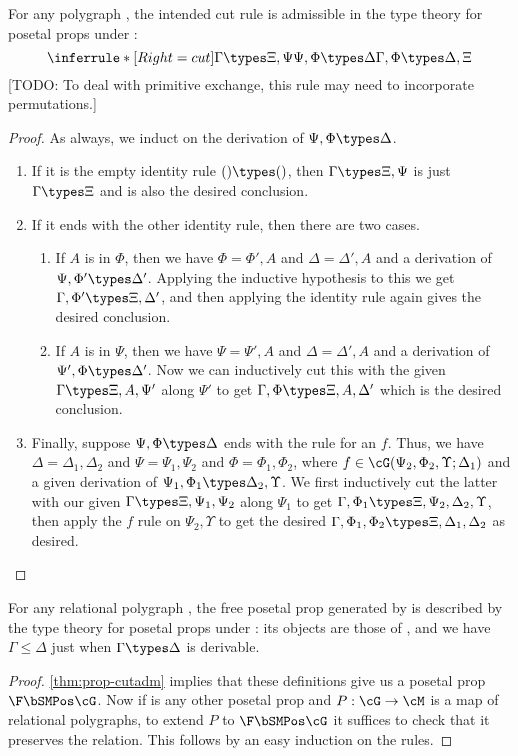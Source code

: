 \begin{thm}\label{thm:prop-cutadm}
  For any polygraph \cG, the intended cut rule is admissible in the type theory for posetal props under \cG:
  \[ \inferrule*[Right=cut]{\Gamma\types\Xi,\Psi \\ \Psi,\Phi \types \Delta}{\Gamma,\Phi \types \Delta,\Xi}\]
  [TODO: To deal with primitive exchange, this rule may need to incorporate permutations.]
\end{thm}
\begin{proof}
  As always, we induct on the derivation of $\Psi,\Phi \types \Delta$.
  \begin{enumerate}
  \item If it is the empty identity rule $()\types()$, then $\Gamma\types\Xi,\Psi$ is just $\Gamma\types\Xi$ and is also the desired conclusion.
  \item If it ends with the other identity rule, then there are two cases.
    \begin{enumerate}
    \item If $A$ is in $\Phi$, then we have $\Phi=\Phi',A$ and $\Delta=\Delta',A$ and a derivation of $\Psi,\Phi'\types\Delta'$.
      Applying the inductive hypothesis to this we get $\Gamma,\Phi'\types \Xi,\Delta'$, and then applying the identity rule again gives the desired conclusion.
    \item If $A$ is in $\Psi$, then we have $\Psi=\Psi',A$ and $\Delta=\Delta',A$ and a derivation of $\Psi',\Phi\types\Delta'$.
      Now we can inductively cut this with the given $\Gamma\types \Xi,A,\Psi'$ along $\Psi'$ to get $\Gamma,\Phi\types \Xi,A,\Delta'$ which is the desired conclusion.
    \end{enumerate}
  \item Finally, suppose $\Psi,\Phi \types \Delta$ ends with the rule for an $f$.
    Thus, we have $\Delta=\Delta_1,\Delta_2$ and $\Psi=\Psi_1,\Psi_2$ and $\Phi=\Phi_1,\Phi_2$, where $f\in\cG(\Psi_2,\Phi_2,\Upsilon;\Delta_1)$ and a given derivation of $\Psi_1,\Phi_1\types \Delta_2,\Upsilon$.
    We first inductively cut the latter with our given $\Gamma\types \Xi,\Psi_1,\Psi_2$ along $\Psi_1$ to get $\Gamma,\Phi_1\types \Xi,\Psi_2,\Delta_2,\Upsilon$, then apply the $f$ rule on $\Psi_2,\Upsilon$ to get the desired $\Gamma,\Phi_1,\Phi_2\types \Xi,\Delta_1,\Delta_2$ as desired.\qedhere
  \end{enumerate}
\end{proof}

\begin{thm}\label{thm:posprop-initial}
  For any relational polygraph \cG, the free posetal prop generated by \cG is described by the type theory for posetal props under \cG: its objects are those of \cG, and we have $\Gamma\le\Delta$ just when $\Gamma\types\Delta$ is derivable.
\end{thm}
\begin{proof}
  \cref{thm:prop-cutadm} implies that these definitions give us a posetal prop $\F\bSMPos\cG$.
  Now if \cM is any other posetal prop and $P:\cG\to\cM$ is a map of relational polygraphs, to extend $P$ to $\F\bSMPos\cG$ it suffices to check that it preserves the relation.
  This follows by an easy induction on the rules.
\end{proof}

